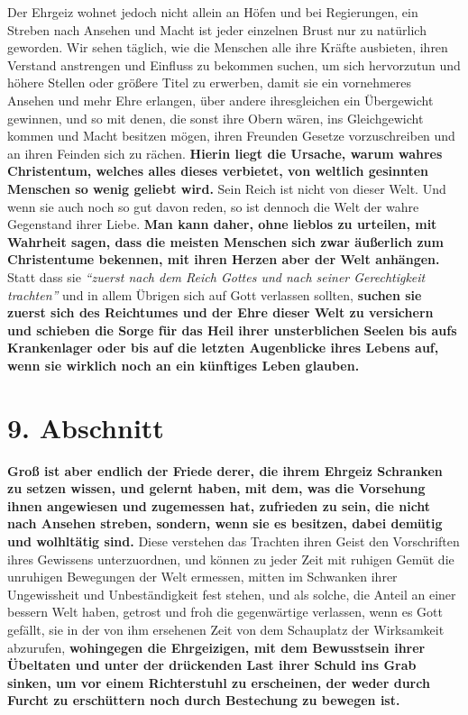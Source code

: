 Der Ehrgeiz wohnet jedoch nicht allein an Höfen und bei Regierungen, ein Streben
nach Ansehen und Macht ist jeder einzelnen Brust nur zu natürlich geworden. Wir
sehen täglich, wie die Menschen alle ihre Kräfte ausbieten, ihren Verstand
anstrengen und Einfluss zu bekommen suchen, um sich hervorzutun und höhere
Stellen oder größere Titel zu erwerben, damit sie ein vornehmeres Ansehen und
mehr Ehre erlangen, über andere ihresgleichen ein Übergewicht gewinnen, und so
mit denen, die sonst ihre Obern wären, ins Gleichgewicht kommen und Macht
besitzen mögen, ihren Freunden Gesetze vorzuschreiben und an ihren Feinden sich
zu rächen.
\label{ref:08_08_reich_gottes} \textbf{Hierin liegt die Ursache, warum wahres
Christentum, welches alles
dieses verbietet, von weltlich gesinnten Menschen so wenig geliebt wird.} Sein
Reich ist nicht von dieser Welt.
Und wenn sie auch noch so gut davon reden, so
ist dennoch die Welt der wahre Gegenstand ihrer Liebe. \textbf{Man kann daher,
ohne
lieblos zu urteilen, mit Wahrheit sagen, dass die meisten Menschen sich zwar
äußerlich zum Christentume bekennen, mit ihren Herzen aber der
Welt anhängen.}
Statt dass sie
\textit{"`zuerst nach dem Reich Gottes und nach seiner Gerechtigkeit
trachten"'}
und in allem Übrigen sich auf Gott verlassen
sollten, \textbf{suchen sie zuerst sich des Reichtumes und der Ehre dieser Welt
zu
versichern und schieben die Sorge für das Heil ihrer unsterblichen Seelen bis
aufs Krankenlager oder bis auf die letzten Augenblicke ihres Lebens auf, wenn
sie wirklich noch an ein künftiges Leben glauben.}

\section{9. Abschnitt} \label{kap8_ab9}

\label{ref:08_09_friedem} \textbf{Groß ist aber endlich der Friede derer,
die ihrem Ehrgeiz Schranken zu setzen wissen, und gelernt haben, mit dem, was
die Vorsehung ihnen angewiesen und
zugemessen hat, zufrieden zu sein,
die nicht nach Ansehen streben, sondern, wenn
sie es besitzen, dabei demütig und wolhltätig sind.} Diese verstehen das
Trachten ihren Geist den Vorschriften ihres Gewissens unterzuordnen, und
können zu jeder Zeit mit ruhigen Gemüt die unruhigen Bewegungen der Welt
ermessen, mitten im Schwanken ihrer Ungewissheit und Unbeständigkeit fest
stehen,
und als solche, die Anteil an einer bessern Welt haben, getrost und froh die
gegenwärtige verlassen, wenn es Gott gefällt, sie in der von ihm
ersehenen Zeit
von dem Schauplatz der Wirksamkeit abzurufen, \textbf{wohingegen die
Ehrgeizigen, mit
dem Bewusstsein ihrer Übeltaten und unter der drückenden Last ihrer
Schuld ins
Grab sinken, um vor einem Richterstuhl zu erscheinen,
der weder durch Furcht zu
erschüttern noch durch Bestechung zu bewegen ist.}



